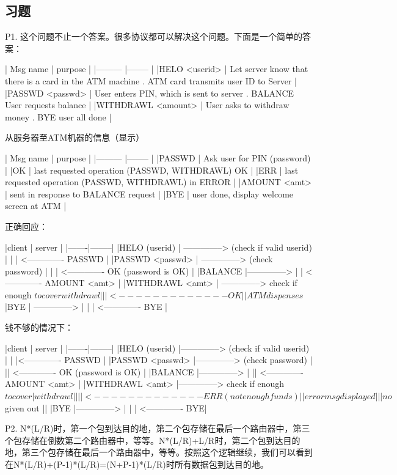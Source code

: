 \documentclass[11pt,UTF8,twoside]{article}
\begin{document}
    \subsection{习题}
	
	P1. 这个问题不止一个答案。很多协议都可以解决这个问题。下面是一个简单的答案：
	
	| Msg name | purpose |
	|--------- |-------- |
	|HELO <userid> | Let server know that there is a card in the ATM machine . ATM card transmits user ID to Server |
	|PASSWD <passwd> | User enters PIN, which is sent to server . BALANCE User requests balance |
	|WITHDRAWL <amount> | User asks to withdraw money . BYE user all done |
	
	从服务器至ATM机器的信息（显示）
	
	| Msg name | purpose |
	|--------- |-------- |
	|PASSWD | Ask user for PIN (password) |
	|OK | last requested operation (PASSWD, WITHDRAWL) OK |
	|ERR | last requested operation (PASSWD, WITHDRAWL) in ERROR |
	|AMOUNT <amt> | sent in response to BALANCE request |
	|BYE | user done, display welcome screen at ATM |
	
	正确回应：
	
	|client | server |
	|-------|--------|
	|HELO (userid) | --------------> (check if valid userid) |
	| | <------------- PASSWD |
	|PASSWD <passwd> | --------------> (check password) |
	| | <------------- OK (password is OK) |
	|BALANCE |--------------> 
	| | <------------- AMOUNT <amt> |
	|WITHDRAWL <amt> | --------------> check if enough $ to cover withdrawl |
	| | <------------- OK |
	|ATM dispenses $ 
	|BYE | --------------> |
	| | <------------- BYE |
	
	钱不够的情况下：
	
	|client | server |
	|-------|--------|
	|HELO (userid) |--------------> (check if valid userid) |
	| |<------------- PASSWD |
	|PASSWD <passwd> |--------------> (check password) |
	|| <------------- OK (password is OK) |
	|BALANCE |--------------> |
	|| <------------- AMOUNT <amt> |
	|WITHDRAWL <amt> |--------------> check if enough $ to cover |
	withdrawl ||
	| |<------------- ERR (not enough funds) |
	|error msg displayed ||
	|no $ given out ||
	|BYE |--------------> |
	| | <------------- BYE|
	
	P2. N*(L/R)时，第一个包到达目的地，第二个包存储在最后一个路由器中，第三个包存储在倒数第二个路由器中，等等。N*(L/R)+L/R时，第二个包到达目的地，第三个包存储在最后一个路由器中，等等。按照这个逻辑继续，我们可以看到在N*(L/R)+(P-1)*(L/R)=(N+P-1)*(L/R)时所有数据包到达目的地。
	
\end{document}
